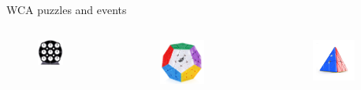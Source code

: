 \documentclass{beamer}
\begin{document}
\begin{frame}{WCA puzzles and events}
\begin{columns}[c]
                            \begin{figure}
                                \includegraphics[width=0.6\textwidth]{clock.jpg}
                            \end{figure}

                            \begin{figure}
                                \includegraphics[width=0.6\textwidth]{mega.jpg}
                            \end{figure}

                            \begin{figure}
                                \includegraphics[width=0.7\textwidth]{pyra.jpg}
                            \end{figure}


\end{columns}
\end{frame}
\end{document}

